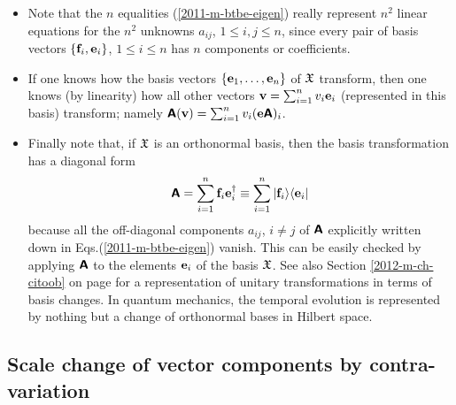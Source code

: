 \begin{itemize}
\item
Note   that the $n$ equalities (\ref {2011-m-btbe-eigen})
really represent $n^2$ linear equations for the $n^2$
unknowns $a_{ij}$, $1\le i,j\le n$, since every pair of basis vectors
$\{{\bf f}_i,{\bf e}_i\}$, $1\le i\le n$ has $n$ components or coefficients.

\item
If one knows how the basis vectors
$
\{
{\bf e}_1,
\ldots ,
{\bf e}_n
\}$ of ${\frak X}$    transform, then one knows (by linearity) how
all other vectors
${\bf v}=
\sum_{i=1}^n v_i{\bf e}_i
$
(represented in this basis) transform; namely
$\textsf{\textbf{A}}({\bf v})=
\sum_{i=1}^n v_i ({\bf e}\textsf{\textbf{A}})_i
$.

\item
Finally note that, if  ${\frak X}$ is an orthonormal basis,
then the basis transformation has a diagonal form
\begin{equation}
\textsf{\textbf{A}} =   \sum_{i=1}^n  {\bf f}_i {\bf e}_i^\dagger
\equiv
\sum_{i=1}^n \vert {\bf f}_i \rangle \langle {\bf e}_i \vert
\label{2013-m-ch-fdvs-dftm}
\end{equation}
because all the off-diagonal components $a_{ij}$, $i\neq j$ of $\textsf{\textbf{A}}$
explicitly written down in Eqs.(\ref{2011-m-btbe-eigen}) vanish.
This can be easily checked by applying $\textsf{\textbf{A}}$ to the elements ${\bf e}_i $ of the basis ${\frak X}$.
See also Section
\ref{2012-m-ch-citoob} on page \pageref{2012-m-ch-citoob}
for a representation of unitary transformations in terms of basis changes.
In quantum mechanics, the temporal evolution is represented by nothing but a change of orthonormal bases in Hilbert space.
\end{itemize}


\subsection{Scale change of vector components by contra-variation}



